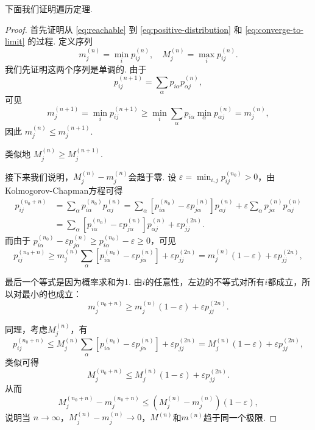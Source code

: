 下面我们证明遍历定理.
\begin{proof}
首先证明从 \eqref{eq:reachable} 到 \eqref{eq:positive-distribution} 和 \eqref{eq:converge-to-limit} 的过程. 定义序列
\[
m_j^{(n)} = \min _i p_{i j}^{(n)}, \quad M_j^{(n)} = \max _i p_{i j}^{(n)}.
\]
我们先证明这两个序列是单调的. 由于
\[
p_{i j}^{(n+1)} = \sum_\alpha p_{i \alpha} p_{\alpha j}^{(n)},
\]
可见
\[
m_j^{(n+1)} = \min _i p_{i j}^{(n+1)} \geq \min _i \sum_\alpha p_{i \alpha} \min _\alpha p_{\alpha j}^{(n)} = m_j^{(n)},
\]
因此 $m_j^{(n)} \leq m_j^{(n+1)}$. 

类似地 $M_j^{(n)} \geq M_j^{(n+1)}$. 

接下来我们说明，$M_j^{(n)} - m_j^{(n)}$会趋于零. 设 $\varepsilon = \min _{i, j} p_{i j}^{\left(n_0\right)} > 0$，由Kolmogorov-Chapman方程可得
\begin{align*}
    p_{i j}^{\left(n_0+n\right)} &= \sum_\alpha p_{i \alpha}^{\left(n_0\right)} p_{\alpha j}^{(n)} = \sum_\alpha\left[p_{i \alpha}^{\left(n_0\right)} - \varepsilon p_{j \alpha}^{(n)}\right] p_{\alpha j}^{(n)} + \varepsilon \sum_\alpha p_{j \alpha}^{(n)} p_{\alpha j}^{(n)} \\
    &= \sum_\alpha\left[p_{i \alpha}^{\left(n_0\right)} - \varepsilon p_{j \alpha}^{(n)}\right] p_{\alpha j}^{(n)} + \varepsilon p_{j j}^{(2 n)}.
\end{align*}
而由于 $p_{i \alpha}^{\left(n_0\right)} - \varepsilon p_{j \alpha}^{(n)} \geq p_{i \alpha}^{\left(n_0\right)} - \varepsilon \geq 0$，可见
\[
p_{i j}^{\left(n_0+n\right)} \geq m_j^{(n)} \sum_\alpha\left[p_{i \alpha}^{\left(n_0\right)} - \varepsilon p_{j \alpha}^{(n)}\right] + \varepsilon p_{j j}^{(2 n)} = m_j^{(n)} (1-\varepsilon) + \varepsilon p_{j j}^{(2 n)},
\]

最后一个等式是因为概率求和为1. 由$i$的任意性，左边的不等式对所有$i$都成立，所以对最小的也成立：
\[
m_j^{\left(n_0+n\right)} \geq m_j^{(n)} (1-\varepsilon) + \varepsilon p_{j j}^{(2 n)}.
\]

同理，考虑$M_j^{(n)}$，有
\[
p_{i j}^{\left(n_0+n\right)} \leq M_j^{(n)} \sum_\alpha\left[p_{i \alpha}^{\left(n_0\right)} - \varepsilon p_{j \alpha}^{(n)}\right] + \varepsilon p_{j j}^{(2 n)}= M_j^{(n)} (1-\varepsilon) + \varepsilon p_{j j}^{(2 n)},
\]
类似可得
\[
M_j^{\left(n_0+n\right)} \leq M_j^{(n)} (1-\varepsilon) + \varepsilon p_{j j}^{(2 n)}.
\]
从而
\[
M_j^{\left(n_0+n\right)} - m_j^{\left(n_0+n\right)} \leq \left(M_j^{(n)} - m_j^{(n)}\right)(1-\varepsilon),
\]
说明当 $n \rightarrow \infty$，$M_j^{(n)} - m_j^{(n)} \to 0$，$M^{(n)}$和$m^{(n)}$趋于同一个极限. 


\end{proof}
